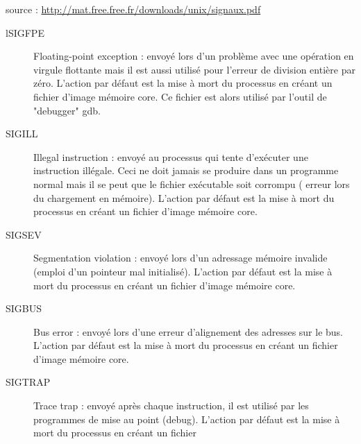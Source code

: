 \documentclass[10pt,french,A4]{article}
\theoremstyle{plain}
\begin{document}
source : \url{http://mat.free.free.fr/downloads/unix/signaux.pdf}
\begin{description}
    \item[lSIGFPE]  Floating-point exception : envoyé lors d'un problème avec une opération en
    virgule flottante mais il est aussi utilisé pour l'erreur de division entière par
    zéro. L'action par défaut est la mise à mort du processus en créant un fichier
    d'image mémoire core. Ce fichier est alors utilisé par l'outil de "debugger"
    gdb.
    \item[SIGILL] Illegal instruction : envoyé au processus qui tente d'exécuter une instruction
    illégale. Ceci ne doit jamais se produire dans un programme normal mais il se
    peut que le fichier exécutable soit corrompu ( erreur lors du chargement en
    mémoire). L'action par défaut est la mise à mort du processus en créant un
    fichier d'image mémoire core.
    \item[SIGSEV] Segmentation violation : envoyé lors d'un adressage mémoire invalide (emploi
    d'un pointeur mal initialisé). L'action par défaut est la mise à mort du
    processus en créant un fichier d'image mémoire core.
    \item[SIGBUS] Bus error : envoyé lors d'une erreur d'alignement des adresses sur le bus.
    L'action par défaut est la mise à mort du processus en créant un fichier
    d'image mémoire core.
    \item[SIGTRAP] Trace trap : envoyé après chaque instruction, il est utilisé par les programmes
    de mise au point (debug).
    L'action par défaut est la mise à mort du processus en créant un fichier
\end{description}
\end{document}
